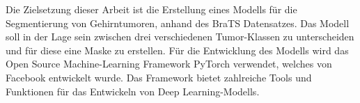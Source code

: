 Die Zielsetzung dieser Arbeit ist die Erstellung eines \gls{Modell}s für die Segmentierung von Gehirntumoren, anhand des BraTS Datensatzes. Das \gls{Modell} soll in der Lage sein zwischen drei verschiedenen Tumor-Klassen zu unterscheiden und für diese eine Maske zu erstellen. Für die Entwicklung des Modells wird das Open Source Machine-Learning Framework PyTorch verwendet, welches von Facebook entwickelt wurde. Das Framework bietet zahlreiche Tools und Funktionen für das Entwickeln von Deep Learning-\glspl{Modell}. \cite[vgl.][]{PyTorch}